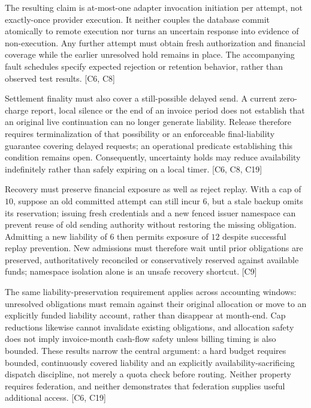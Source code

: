 \documentclass[11pt]{article}
\begin{document}
The resulting claim is at-most-one adapter invocation initiation per attempt, not exactly-once provider execution. It neither couples the database commit atomically to remote execution nor turns an uncertain response into evidence of non-execution. Any further attempt must obtain fresh authorization and financial coverage while the earlier unresolved hold remains in place. The accompanying fault schedules specify expected rejection or retention behavior, rather than observed test results. [C6, C8]

Settlement finality must also cover a still-possible delayed send. A current zero-charge report, local silence or the end of an invoice period does not establish that an original live continuation can no longer generate liability. Release therefore requires terminalization of that possibility or an enforceable final-liability guarantee covering delayed requests; an operational predicate establishing this condition remains open. Consequently, uncertainty holds may reduce availability indefinitely rather than safely expiring on a local timer. [C6, C8, C19]

Recovery must preserve financial exposure as well as reject replay. With a cap of $10$, suppose an old committed attempt can still incur $6$, but a stale backup omits its reservation; issuing fresh credentials and a new fenced issuer namespace can prevent reuse of old sending authority without restoring the missing obligation. Admitting a new liability of $6$ then permits exposure of $12$ despite successful replay prevention. New admissions must therefore wait until prior obligations are preserved, authoritatively reconciled or conservatively reserved against available funds; namespace isolation alone is an unsafe recovery shortcut. [C9]

The same liability-preservation requirement applies across accounting windows: unresolved obligations must remain against their original allocation or move to an explicitly funded liability account, rather than disappear at month-end. Cap reductions likewise cannot invalidate existing obligations, and allocation safety does not imply invoice-month cash-flow safety unless billing timing is also bounded. These results narrow the central argument: a hard budget requires bounded, continuously covered liability and an explicitly availability-sacrificing dispatch discipline, not merely a quota check before routing. Neither property requires federation, and neither demonstrates that federation supplies useful additional access. [C6, C19]
\end{document}
